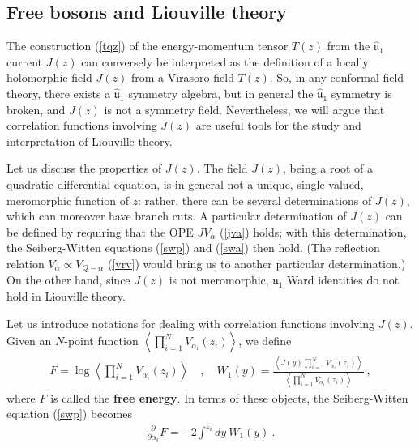 \documentclass[12pt,a4paper,notitlepage]{report}
\newcommand \la {\left\langle}
\newcommand \ra {\right\rangle}
\newcommand \p {\partial}
\newcommand \pp[1] {{\frac{\p}{\p #1}}}
\numberwithin{equation}{section}
\theoremstyle{break}
\begin{document}
\subsection{Free bosons and Liouville theory \label{seclld}}

The construction (\ref{tqz}) of the energy-momentum tensor $T(z)$ from the $\hat{\mathfrak{u}}_1$ current $J(z)$ can conversely be interpreted as the definition of a locally holomorphic field $J(z)$ from a Virasoro field $T(z)$. So, in any conformal field theory, there exists a $\hat{\mathfrak{u}}_1$ symmetry algebra, but in general the $\hat{\mathfrak{u}}_1$ symmetry is broken, and $J(z)$ is not a symmetry field. Nevertheless, we will argue that correlation functions involving $J(z)$ are useful tools for the study and interpretation of Liouville theory. 

Let us discuss the properties of $J(z)$. The field $J(z)$, being a root of a quadratic differential equation, is in general not a unique, single-valued, meromorphic function of $z$: rather, there can be several determinations of $J(z)$, which can moreover have branch cuts. 
A particular determination of $J(z)$ can be defined by requiring that the 
OPE $JV_\alpha$ (\ref{jva}) holds; with this determination, the Seiberg-Witten equations (\ref{swp}) and (\ref{swa}) then hold.  
(The reflection relation $V_\alpha \propto V_{Q-\alpha}$ (\ref{vrv}) would bring us to another particular determination.)
On the other hand, since $J(z)$ is not meromorphic, $\hat{\mathfrak{u}}_1$ Ward identities do not hold in Liouville theory.

Let us introduce notations for dealing with correlation functions involving $J(z)$. 
Given an $N$-point function $\la \prod_{i=1}^N V_{\alpha_i}(z_i) \ra$, we define
\begin{align}
 \boxed{F= \log \la \prod_{i=1}^N V_{\alpha_i}(z_i) \ra} \quad , \quad \boxed{W_1(y) = \frac{\la J(y)\prod_{i=1}^N V_{\alpha_i}(z_i) \ra}{\la \prod_{i=1}^N V_{\alpha_i}(z_i) \ra}} \ ,
\end{align}
where $F$ is called the \textbf{\boldmath free energy}. 
In terms of these objects, the Seiberg-Witten equation (\ref{swp}) becomes 
\begin{align}
 \pp{\alpha_i} F = -2 \int^{z_i} dy \ W_1(y)\ . 
\label{daf}
\end{align}
\end{document}

